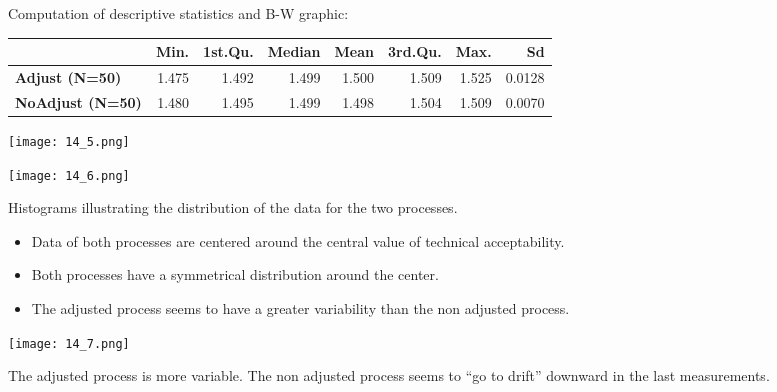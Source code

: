 \begin{frame}
Computation of descriptive statistics and B-W graphic:
	\vspace{.3cm}
	\begin{footnotesize}
	\begin{tabular}{|l|rrrrrrr|}
	\hline
	& \textbf{Min}. & 1\textbf{st.Qu}. & \textbf{Median} & \textbf{Mean} & \textbf{3rd.Qu.} & \textbf{Max.} & \textbf{Sd}\\
	\hline
	\textbf{Adjust (N=50)} & 1.475 & 1.492 & 1.499 & 1.500 & 1.509 & 1.525 & 0.0128\\
	\textbf{NoAdjust (N=50)} & 1.480 & 1.495  & 1.499 & 1.498 & 1.504 & 1.509 & 0.0070\\
	\hline	
	\end{tabular}
	\end{footnotesize}
	\begin{center}
		\texttt{[image: 14\_5.png]}
	\end{center}
\end{frame}

\begin{frame}
	\begin{center}
		\texttt{[image: 14\_6.png]}
	\end{center}
  \begin{center}  
\begin{footnotesize}Histograms illustrating the distribution of the data for the two processes.
\end{footnotesize}
  \end{center}
\end{frame}

\begin{frame}
  \begin{itemize}
    \item Data of both processes are centered around the central value of  technical acceptability.
    \item Both processes have a symmetrical distribution around the center. 
    \item The adjusted process seems to have a greater variability than the non adjusted process.
  \end{itemize}
\end{frame}

\begin{frame}
	\begin{center}
		\texttt{[image: 14\_7.png]}
	\end{center}
\begin{center}  
\begin{footnotesize} The adjusted process is more variable. The non adjusted process seems to ``go to drift'' downward in the last measurements.
\end{footnotesize}
  \end{center}
\end{frame}

